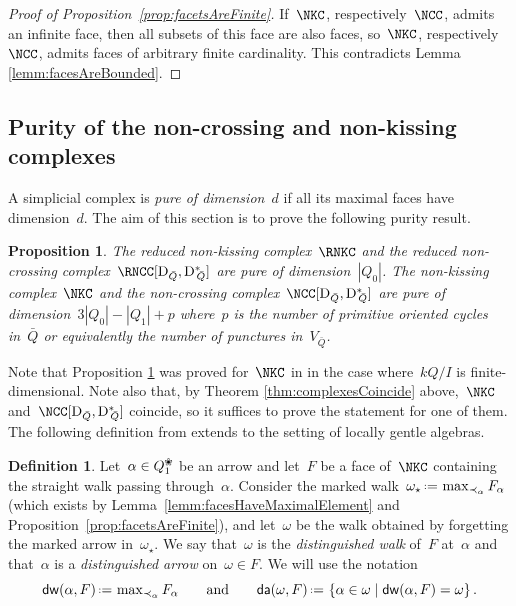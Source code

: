 \documentclass{amsart}
\newtheorem{proposition}[theorem]{Proposition}
\theoremstyle{definition}
\newtheorem{definition}[theorem]{Definition}
\newcommand{\set}[2]{\left\{ #1 \;\middle|\; #2 \right\}} %
\newcommand{\eqdef}{\mbox{\,\raisebox{0.2ex}{\scriptsize\ensuremath{\mathrm:}}\ensuremath{=}\,}} %
\newcommand{\darkblue}{\color{darkblue}} %
\newcommand{\defn}[1]{\textsl{\darkblue #1}} %
\newcommand{\blossom}{^\text{\ding{96}}} %
\newcommand{\distinguishedWalk}[2]{\mathsf{dw}(#1,#2)} %
\newcommand{\distinguishedArrows}[2]{\mathsf{da}(#1,#2)} %
\newcommand{\dual}{^*} %
\newcommand{\dissection}{\mathrm{D}} %
\begin{document}
\begin{proof}[Proof of Proposition~\ref{prop:facetsAreFinite}]
 If~$\NKC$, respectively~$\NCC$, admits an infinite face, then all subsets of this face are also faces, so~$\NKC$, respectively~$\NCC$, admits faces of arbitrary finite cardinality.
 This contradicts Lemma \ref{lemm:facesAreBounded}.
\end{proof}

\subsection{Purity of the non-crossing and non-kissing complexes}

A simplicial complex is \defn{pure of dimension~$d$} if all its maximal faces have dimension~$d$.
The aim of this section is to prove the following purity result.

\begin{proposition}
\label{prop:purity}
The reduced non-kissing complex~$\RNKC$ and the reduced non-crossing complex~$\RNCC[\dissection_{\bar Q}, {\dissection\dual\!\!_{\bar Q}}]$ are pure of dimension~$|Q_0|$.
The non-kissing complex~$\NKC$ and the non-crossing complex~$\NCC[\dissection_{\bar Q}, {\dissection\dual\!\!_{\bar Q}}]$ are pure of dimension~$3|Q_0| - |Q_1| + p$ where~$p$ is the number of primitive oriented cycles in~$\bar Q$ or equivalently the number of punctures in~$V_{\bar Q}$.
\end{proposition}

Note that Proposition \ref{prop:purity} was proved for~$\NKC$ in \cite[Cor.~2.27]{PaluPilaudPlamondon} in the case where~$kQ/I$ is finite-dimensional.
Note also that, by Theorem \ref{thm:complexesCoincide} above,~$\NKC$ and~$\NCC[\dissection_{\bar Q}, {\dissection\dual\!\!_{\bar Q}}]$ coincide, so it suffices to prove the statement for one of them.
The following definition from \cite[Def.~2.23]{PaluPilaudPlamondon} extends to the setting of locally gentle algebras.

\begin{definition}
\label{def:distinguishedWalksAndArrows}
Let~$\alpha \in Q\blossom_1$ be an arrow and let~$F$ be a face of~$\NKC$ containing the straight walk passing through~$\alpha$.
Consider the marked walk~$\omega_\star \eqdef \max_{\prec_\alpha} F_\alpha$ (which exists by Lemma~\ref{lemm:facesHaveMaximalElement} and Proposition~\ref{prop:facetsAreFinite}),
and let~$\omega$ be the walk obtained by forgetting the marked arrow in~$\omega_\star$. 
We say that~$\omega$ is the \defn{distinguished walk} of~$F$ at~$\alpha$ and that~$\alpha$ is a \defn{distinguished arrow} on~$\omega \in F$.
We will use the notation
\[
\distinguishedWalk{\alpha}{F} \eqdef \max\nolimits_{\prec_\alpha} F_\alpha
\qquad\text{and}\qquad
\distinguishedArrows{\omega}{F} \eqdef \set{\alpha \in \omega}{\distinguishedWalk{\alpha}{F} = \omega}.
\]
\end{definition}
\end{document}
